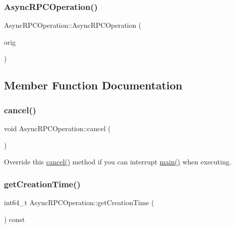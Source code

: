 \subsubsection{\texorpdfstring{Async\+R\+P\+C\+Operation()}{AsyncRPCOperation()}\hspace{0.1cm}{\footnotesize\ttfamily [2/2]}}
{\footnotesize\ttfamily Async\+R\+P\+C\+Operation\+::\+Async\+R\+P\+C\+Operation (\begin{DoxyParamCaption}\item[{const \mbox{\hyperlink{class_async_r_p_c_operation}{Async\+R\+P\+C\+Operation}} \&}]{orig }\end{DoxyParamCaption})\hspace{0.3cm}{\ttfamily [private]}}



\subsection{Member Function Documentation}
\mbox{\label{class_async_r_p_c_operation_ac381d872b2673a45c3cfeb35f6e008aa}} 
\subsubsection{\texorpdfstring{cancel()}{cancel()}}
{\footnotesize\ttfamily void Async\+R\+P\+C\+Operation\+::cancel (\begin{DoxyParamCaption}{ }\end{DoxyParamCaption})}

Override this \mbox{\hyperlink{class_async_r_p_c_operation_ac381d872b2673a45c3cfeb35f6e008aa}{cancel()}} method if you can interrupt \mbox{\hyperlink{class_async_r_p_c_operation_a37b00fb2684a303d04109b7e9b95ed36}{main()}} when executing. \mbox{\label{class_async_r_p_c_operation_ae7baefce223a953ef027ac064c2889d9}} 
\subsubsection{\texorpdfstring{get\+Creation\+Time()}{getCreationTime()}}
{\footnotesize\ttfamily int64\+\_\+t Async\+R\+P\+C\+Operation\+::get\+Creation\+Time (\begin{DoxyParamCaption}{ }\end{DoxyParamCaption}) const\hspace{0.3cm}{\ttfamily [inline]}}

